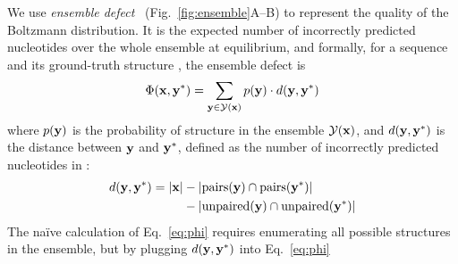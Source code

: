 We use {\em ensemble defect}~\cite{Zadeh+:2010} (Fig.~\ref{fig:ensemble}A--B)
to represent the quality of the Boltzmann distribution.
It is the expected number of incorrectly predicted nucleotides over the whole ensemble at equilibrium,
and formally,
for a sequence \vecx and its ground-truth structure \vecystar, the ensemble defect is%
\begin{equation}
\vspace{-0.2cm}
\Phi(\vecx,\vecystar) = \sum_{\vecy \in \mathcal{Y}(\vecx)} p(\vecy) \cdot d(\vecy, \vecystar) %
\label{eq:phi}
\end{equation}
where %
$p(\mathbf{y})$ %
is the probability of structure \vecy %
in the ensemble %
$\mathcal{Y(\mathbf{x})}$,
and $d(\mathbf{y}, \mathbf{y}^*)$ is the distance between $\mathbf{y}$ and $\mathbf{y}^*$, %
defined as the number of incorrectly predicted nucleotides in \vecy:
\vspace{-0.3cm}
 \[%
  \begin{split}
    d(\vecy,\vecystar)=  |\vecx|  & - |\pairs(\vecy) \cap \pairs(\vecystar)|\\
                        & - |\unpaired(\vecy) \cap\unpaired(\vecystar)|
  \end{split}
 \]%
 The na\"ive calculation of Eq.~\ref{eq:phi} requires enumerating all possible %
 structures in the ensemble, %
  but by plugging $d(\mathbf{y}, \mathbf{y}^*)$ %
  into Eq.~\ref{eq:phi} %

